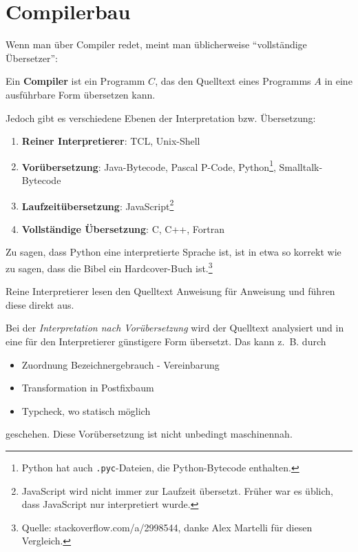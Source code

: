 \chapter{Compilerbau}

Wenn man über Compiler redet, meint man üblicherweise \enquote{vollständige Übersetzer}:

\begin{definition}%
	Ein \textbf{Compiler} ist ein Programm $C$, das den Quelltext eines Programms
	$A$ in eine ausführbare Form übersetzen kann.
\end{definition}

Jedoch gibt es verschiedene Ebenen der Interpretation bzw. Übersetzung:
\begin{enumerate}
	\item \textbf{Reiner Interpretierer}: TCL, Unix-Shell
	\item \textbf{Vorübersetzung}: Java-Bytecode, Pascal P-Code, Python\footnote{Python hat auch \texttt{.pyc}-Dateien, die Python-Bytecode enthalten.}, Smalltalk-Bytecode
	\item \textbf{Laufzeitübersetzung}: JavaScript\footnote{JavaScript wird nicht immer zur Laufzeit übersetzt. Früher war es üblich, dass JavaScript nur interpretiert wurde.}
	\item \textbf{Vollständige Übersetzung}: C, C++, Fortran
\end{enumerate}

Zu sagen, dass Python eine interpretierte Sprache ist, ist in etwa so korrekt
wie zu sagen, dass die Bibel ein Hardcover-Buch ist.\footnote{Quelle: stackoverflow.com/a/2998544, danke Alex Martelli für diesen Vergleich.}

Reine Interpretierer lesen den Quelltext Anweisung für Anweisung und führen
diese direkt aus.


Bei der \textit{Interpretation nach Vorübersetzung} wird der Quelltext analysiert
und in eine für den Interpretierer günstigere Form übersetzt. Das kann z.~B.
durch
\begin{itemize}
	\item Zuordnung Bezeichnergebrauch - Vereinbarung
	\item Transformation in Postfixbaum
	\item Typcheck, wo statisch möglich
\end{itemize}
geschehen. Diese Vorübersetzung ist nicht unbedingt maschinennah.


